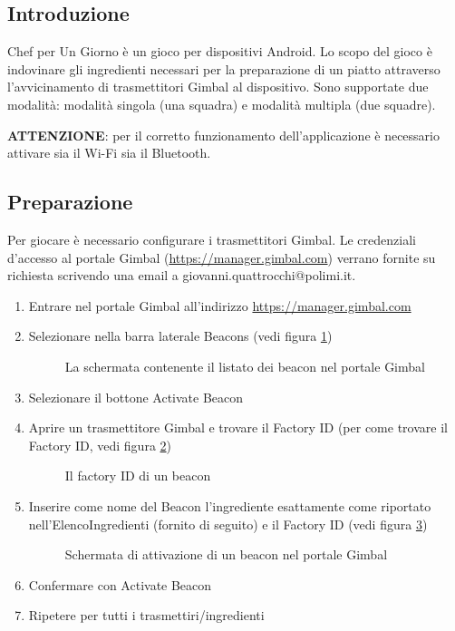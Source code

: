 \subsection{Introduzione}
Chef per Un Giorno è un gioco per dispositivi Android. Lo scopo del gioco è indovinare gli ingredienti necessari per la preparazione di un piatto attraverso l’avvicinamento di trasmettitori Gimbal al dispositivo. Sono supportate due modalità: modalità singola (una squadra) e modalità multipla (due squadre).

\textbf{ATTENZIONE}: per il corretto funzionamento dell’applicazione è necessario attivare sia il Wi-Fi sia il Bluetooth.

\subsection{Preparazione}

Per giocare è necessario configurare i trasmettitori Gimbal. Le credenziali d’accesso al portale Gimbal (\url{https://manager.gimbal.com}) verrano fornite su richiesta scrivendo una email a giovanni.quattrocchi@polimi.it.

\begin{enumerate}
\item Entrare nel portale Gimbal all’indirizzo \url{https://manager.gimbal.com}
\item Selezionare nella barra laterale Beacons (vedi figura \ref{fig:beacons})

\begin{figure}[h!]
\label{fig:beacons}
\centering
{}
\caption{La schermata contenente il listato dei beacon nel portale Gimbal}
\end{figure}

\item Selezionare il bottone Activate Beacon
\item Aprire un trasmettitore Gimbal e trovare il Factory ID (per come trovare il Factory ID, vedi figura \ref{fig:factoryid})

\begin{figure}[h!]
\label{fig:factoryid}
\centering
{}
\caption{Il factory ID di un beacon}
\end{figure}

\item Inserire come nome del Beacon l’ingrediente esattamente come riportato nell’ElencoIngredienti (fornito di seguito) e il Factory ID (vedi figura \ref{fig:activate-beacon})

\begin{figure}[h!]
\label{fig:activate-beacon}
\centering
{}
\caption{Schermata di attivazione di un beacon nel portale Gimbal}
\end{figure}

\item Confermare con Activate Beacon
\item Ripetere per tutti i trasmettiri/ingredienti
\end{enumerate}

